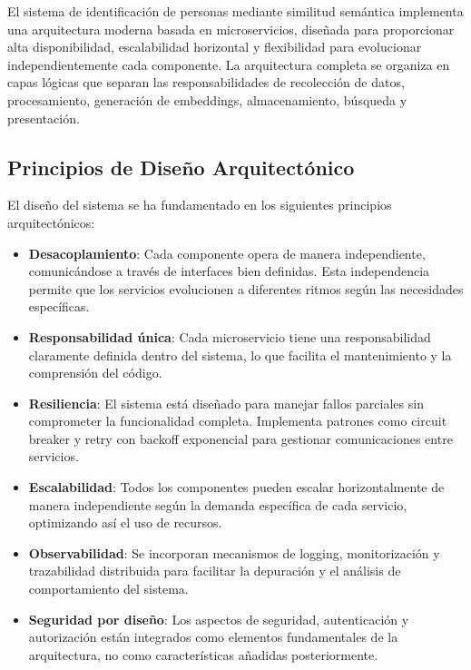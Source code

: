 \documentclass[12pt,a4paper]{article}
\begin{document}
El sistema de identificación de personas mediante similitud semántica implementa una arquitectura moderna basada en microservicios, diseñada para proporcionar alta disponibilidad, escalabilidad horizontal y flexibilidad para evolucionar independientemente cada componente. La arquitectura completa se organiza en capas lógicas que separan las responsabilidades de recolección de datos, procesamiento, generación de embeddings, almacenamiento, búsqueda y presentación.

\subsection{Principios de Diseño Arquitectónico}
\label{subsec:principios-diseno}

El diseño del sistema se ha fundamentado en los siguientes principios arquitectónicos:

\begin{itemize}
    \item \textbf{Desacoplamiento}: Cada componente opera de manera independiente, comunicándose a través de interfaces bien definidas. Esta independencia permite que los servicios evolucionen a diferentes ritmos según las necesidades específicas.
    
    \item \textbf{Responsabilidad única}: Cada microservicio tiene una responsabilidad claramente definida dentro del sistema, lo que facilita el mantenimiento y la comprensión del código.
    
    \item \textbf{Resiliencia}: El sistema está diseñado para manejar fallos parciales sin comprometer la funcionalidad completa. Implementa patrones como circuit breaker y retry con backoff exponencial para gestionar comunicaciones entre servicios.
    
    \item \textbf{Escalabilidad}: Todos los componentes pueden escalar horizontalmente de manera independiente según la demanda específica de cada servicio, optimizando así el uso de recursos.
    
    \item \textbf{Observabilidad}: Se incorporan mecanismos de logging, monitorización y trazabilidad distribuida para facilitar la depuración y el análisis de comportamiento del sistema.
    
    \item \textbf{Seguridad por diseño}: Los aspectos de seguridad, autenticación y autorización están integrados como elementos fundamentales de la arquitectura, no como características añadidas posteriormente.
\end{itemize}
\end{document}
